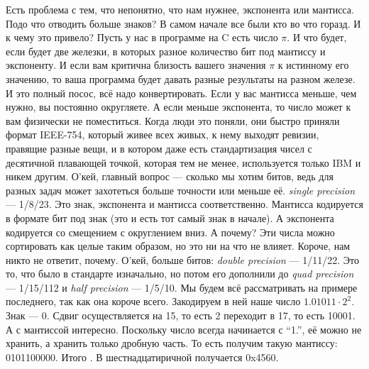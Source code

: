 \documentclass{article}
\begin{document}
    Есть проблема с тем, что непонятно, что нам нужнее, экспонента или мантисса. Подо что отводить больше знаков? В самом начале все были кто во что горазд. И к чему это привело? Пусть у нас в программе на C есть число $\pi$. И что будет, если будет две железки, в которых разное количество бит под мантиссу и экспоненту. И если вам критична близость вашего значения $\pi$ к истинному его значению, то ваша программа будет давать разные результаты на разном железе. И это полный посос, всё надо конвертировать. Если у вас мантисса меньше, чем нужно, вы постоянно округляете. А если меньше экспонента, то число может к вам физически не поместиться. Когда люди это поняли, они быстро приняли формат IEEE-754, который живее всех живых, к нему выходят ревизии, правящие разные вещи, и в котором даже есть стандартизация чисел с десятичной плавающей точкой, которая тем не менее, используется только IBM и никем другим. О'кей, главный вопрос --- сколько мы хотим битов, ведь для разных задач может захотеться больше точности или меньше её. \textit{single precision} --- 1/8/23. Это знак, экспонента и мантисса соответственно. Мантисса кодируется в формате бит под знак (это и есть тот самый знак в начале). А экспонента кодируется со смещением с округлением вниз. А почему? Эти числа можно сортировать как целые таким образом, но это ни на что не влияет. Короче, нам никто не ответит, почему. О'кей, больше битов: \textit{double precision} --- 1/11/22. Это то, что было в стандарте изначально, но потом его дополнили до \textit{quad precision} --- 1/15/112 и \textit{half precision} --- 1/5/10. Мы будем всё рассматривать на примере последнего, так как она короче всего. Закодируем в ней наше число $1.01011\cdot2^2$. Знак --- 0. Сдвиг осуществляется на 15, то есть 2 переходит в 17, то есть 10001. А с мантиссой интересно. Поскольку число всегда начинается с ``1.'', её можно не хранить, а хранить только дробную часть. То есть получим такую мантиссу: 0101100000. Итого . В шестнадцатиричной получается 0x4560.\\
\end{document}
